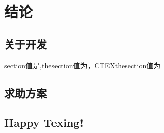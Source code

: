 \chapter{结论}
\section{关于开发}
section值是,thesection值为\thesection{}，CTEXthesection值为\CTEXthesection{}
\section{求助方案}
\section{Happy Texing!}